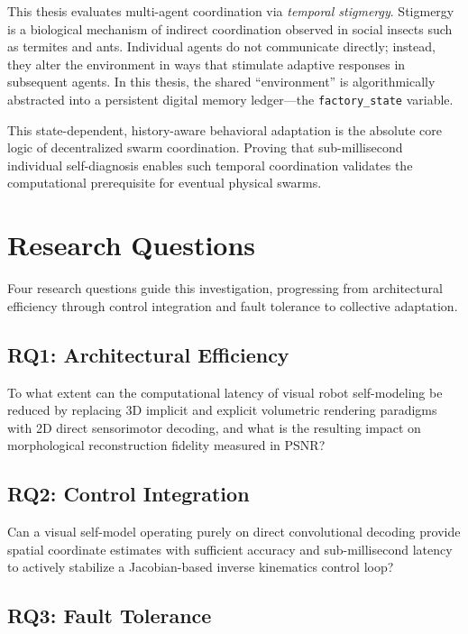 \documentclass[12pt,a4paper,oneside]{report}
\begin{document}
This thesis evaluates multi-agent coordination via \textit{temporal stigmergy}. Stigmergy is a biological mechanism of indirect coordination observed in social insects such as termites and ants. Individual agents do not communicate directly; instead, they alter the environment in ways that stimulate adaptive responses in subsequent agents. In this thesis, the shared ``environment'' is algorithmically abstracted into a persistent digital memory ledger---the \texttt{factory\_state} variable. 

This state-dependent, history-aware behavioral adaptation is the absolute core logic of decentralized swarm coordination. Proving that sub-millisecond individual self-diagnosis enables such temporal coordination validates the computational prerequisite for eventual physical swarms.

\section{Research Questions}
\label{sec:research_questions_intro}

Four research questions guide this investigation, progressing from architectural efficiency through control integration and fault tolerance to collective adaptation.

\subsection{RQ1: Architectural Efficiency}
\label{subsec:RQ1_intro}

To what extent can the computational latency of visual robot self-modeling be reduced by replacing 3D implicit and explicit volumetric rendering paradigms with 2D direct sensorimotor decoding, and what is the resulting impact on morphological reconstruction fidelity measured in PSNR?

\subsection{RQ2: Control Integration}
\label{subsec:RQ2_intro}

Can a visual self-model operating purely on direct convolutional decoding provide spatial coordinate estimates with sufficient accuracy and sub-millisecond latency to actively stabilize a Jacobian-based inverse kinematics control loop?

\subsection{RQ3: Fault Tolerance}
\label{subsec:RQ3_intro}
\end{document}
